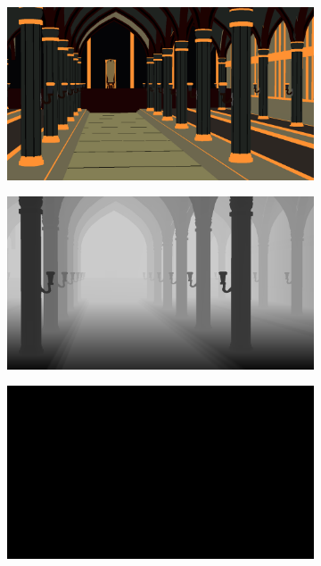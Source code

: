 \begin{figure}
    \centering
    \begin{subfigure}{0.24\linewidth}
        \centering
         \includegraphics[width=\textwidth]{figures/methods/dataset_example/albedo.png}
         \caption{}
         \label{fig:rendering_dataset_albedo}
    \end{subfigure}
    \hfill
    \begin{subfigure}{0.24\linewidth}
        \centering
         \includegraphics[width=\textwidth]{figures/methods/dataset_example/depth.png}
         \caption{}
         \label{fig:rendering_dataset_depth}
    \end{subfigure}
    \hfill
    \begin{subfigure}{0.24\linewidth}
        \centering
         \includegraphics[width=\textwidth]{figures/methods/dataset_example/emissive.png}

\end{subfigure}
\end{figure}
